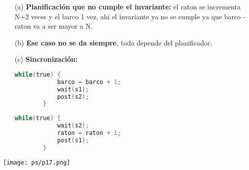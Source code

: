 \documentclass[openany]{book}
\begin{document}
\begin{rta}
    \begin{itemize}
        \item[(a)] \textbf{Planificación que no cumple el invariante:} el raton se incrementa N+2 veces y el barco 1 vez, ahi el invariante ya no se cumple ya que barco - raton va a ser mayor a N.
        \item[(b)] \textbf{Ese caso no se da siempre}, todo depende del planificador.
        \item[(c)] \textbf{Sincronización:} \newline
        \begin{minipage}{0.49\textwidth}
    \begin{lstlisting}[language=C]
        while(true) {
            barco = barco + 1;
            wait(s1);
            post(s2);
        }
    \end{lstlisting}
        \end{minipage}
        \begin{minipage}{0.49\textwidth}
    \begin{lstlisting}[language=C]
        while(true) {
            wait(s2);
            raton = raton + 1;
            post(s1);
        }
    \end{lstlisting}
        \end{minipage}
    \end{itemize}
\end{rta}

\texttt{[image: ps/p17.png]}
\end{document}

